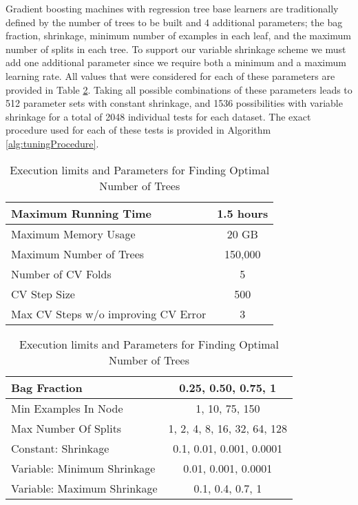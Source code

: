 \documentclass[9pt, conference]{IEEEtran}
\begin{document}
Gradient boosting machines with regression tree base learners are traditionally defined by the number of trees to be built and 4 additional parameters; the bag fraction, shrinkage, minimum number of examples in each leaf, and the maximum number of splits in each tree. To support our variable shrinkage scheme we must add one additional parameter since we require both a minimum and a maximum learning rate. All values that were considered for each of these parameters are provided in Table \ref{tab:parameters}. Taking all possible combinations of these parameters leads to 512 parameter sets with constant shrinkage, and 1536 possibilities with variable shrinkage for a total of 2048 individual tests for each dataset. The exact procedure used for each of these tests is provided in Algorithm \ref{alg:tuningProcedure}.
\begin{table}
	\centering
	\begin{tabular}{ | l || c |}
		\hline
		Maximum Running Time & 1.5 hours \\ \hline
		Maximum Memory Usage & 20 GB \\ \hline
		Maximum Number of Trees & 150,000 \\ \hline
		Number of CV Folds & 5 \\ \hline
		CV Step Size & 500 \\ \hline
		Max CV Steps w/o improving CV Error	& 3 \\ \hline
	\end{tabular}
	\caption{Execution limits and Parameters for Finding Optimal Number of Trees}
	\label{tab:findOptTreeParam}
\end{table}
\begin{table}
	\centering
		\begin{tabular}	{ | l || c |}
			\hline
			Bag Fraction & 0.25, 0.50, 0.75, 1 \\ \hline
			Min Examples In Node & 1, 10, 75, 150 \\ \hline
			Max Number Of Splits & 1, 2, 4, 8, 16, 32, 64, 128 \\ \hline
			Constant: Shrinkage & 0.1, 0.01, 0.001, 0.0001 \\ \hline
			Variable: Minimum Shrinkage & 0.01, 0.001, 0.0001 \\ \hline
			Variable: Maximum Shrinkage & 0.1, 0.4, 0.7, 1 \\
			\hline
			
		\end{tabular}
		\caption{Execution limits and Parameters for Finding Optimal Number of Trees}
		\label{tab:parameters}
\end{table}
\end{document}
